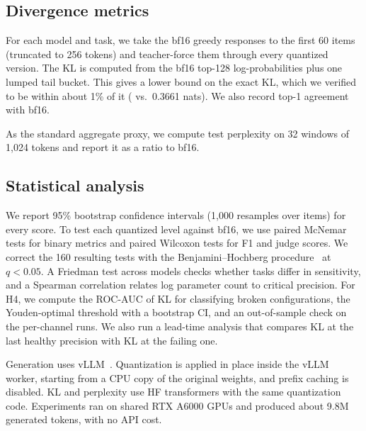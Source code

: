 \subsection{Divergence metrics}
 For each model and task, we take the bf16 greedy responses to the first 60 items (truncated to 256 tokens) and teacher-force them through every quantized version. The KL is computed from the bf16 top-128 log-probabilities plus one lumped tail bucket. This gives a lower bound on the exact KL, which we verified to be within about 1\% of it ( vs.\ 0.3661 nats). We also record top-1 agreement with bf16.

 As the standard aggregate proxy, we compute \wikitext test perplexity on 32 windows of 1,024 tokens and report it as a ratio to bf16.

\subsection{Statistical analysis}
We report 95\% bootstrap confidence intervals (1,000 resamples over items) for every score. To test each quantized level against bf16, we use paired McNemar tests for binary metrics and paired Wilcoxon tests for F1 and judge scores. We correct the 160 resulting tests with the Benjamini--Hochberg procedure~\cite{benjamini1995controlling} at $q<0.05$. A Friedman test across models checks whether tasks differ in sensitivity, and a Spearman correlation relates log parameter count to critical precision. For H4, we compute the ROC-AUC of KL for classifying broken configurations, the Youden-optimal threshold with a bootstrap CI, and an out-of-sample check on the per-channel runs. We also run a lead-time analysis that compares KL at the last healthy precision with KL at the failing one.

 Generation uses vLLM~\cite{kwon2023vllm}. Quantization is applied in place inside the vLLM worker, starting from a CPU copy of the original weights, and prefix caching is disabled. KL and perplexity use HF transformers with the same quantization code. Experiments ran on shared RTX A6000 GPUs and produced about 9.8M generated tokens, with no API cost.
